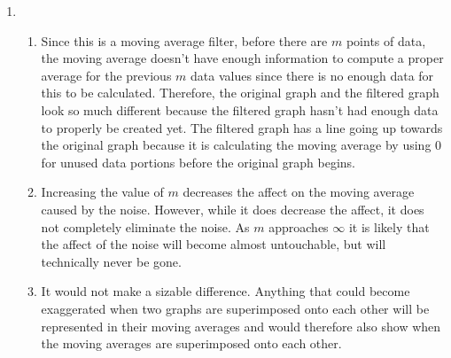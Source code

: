 \documentclass{article}
\begin{document}
\begin{enumerate}
    \item
    
    \begin{enumerate}
        \item 
        
        Since this is a moving average filter, before there are $m$ points of data, the moving average doesn't have enough information to compute a proper average for the previous $m$ data values since there is no enough data for this to be calculated. Therefore, the original graph and the filtered graph look so much different because the filtered graph hasn't had enough data to properly be created yet. The filtered graph has a line going up towards the original graph because it is calculating the moving average by using $0$ for unused data portions before the original graph begins.
        
        \item
        
        Increasing the value of $m$ decreases the affect on the moving average caused by the noise. However, while it does decrease the affect, it does not completely eliminate the noise. As $m$ approaches $\infty$ it is likely that the affect of the noise will become almost untouchable, but will technically never be gone.
        
        \item
        
        It would not make a sizable difference. Anything that could become exaggerated when two graphs are superimposed onto each other will be represented in their moving averages and would therefore also show when the moving averages are superimposed onto each other.
        
    \end{enumerate}
    
\end{enumerate}
\end{document}
